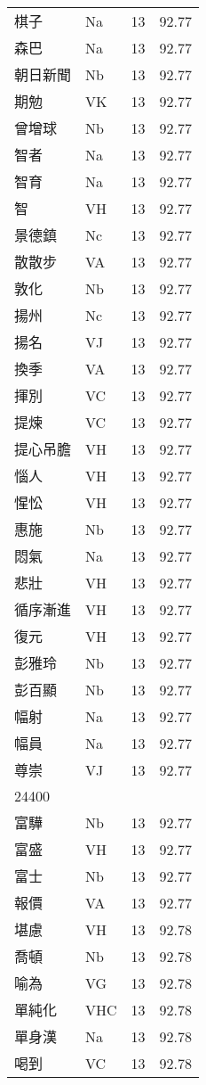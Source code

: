 \documentclass[twocolumn]{book}
\begin{document}
\begin{supertabular}{llrr}
棋子 & Na & 13 &  92.77\\
森巴 & Na & 13 &  92.77\\
朝日新聞 & Nb & 13 &  92.77\\
期勉 & VK & 13 &  92.77\\
曾增球 & Nb & 13 &  92.77\\
智者 & Na & 13 &  92.77\\
智育 & Na & 13 &  92.77\\
智 & VH & 13 &  92.77\\
景德鎮 & Nc & 13 &  92.77\\
散散步 & VA & 13 &  92.77\\
敦化 & Nb & 13 &  92.77\\
揚州 & Nc & 13 &  92.77\\
揚名 & VJ & 13 &  92.77\\
換季 & VA & 13 &  92.77\\
揮別 & VC & 13 &  92.77\\
提煉 & VC & 13 &  92.77\\
提心吊膽 & VH & 13 &  92.77\\
惱人 & VH & 13 &  92.77\\
惺忪 & VH & 13 &  92.77\\
惠施 & Nb & 13 &  92.77\\
悶氣 & Na & 13 &  92.77\\
悲壯 & VH & 13 &  92.77\\
循序漸進 & VH & 13 &  92.77\\
復元 & VH & 13 &  92.77\\
彭雅玲 & Nb & 13 &  92.77\\
彭百顯 & Nb & 13 &  92.77\\
幅射 & Na & 13 &  92.77\\
幅員 & Na & 13 &  92.77\\
尊崇 & VJ & 13 &  92.77\\
24400\\
富驊 & Nb & 13 &  92.77\\
富盛 & VH & 13 &  92.77\\
富士 & Nb & 13 &  92.77\\
報價 & VA & 13 &  92.77\\
堪慮 & VH & 13 &  92.78\\
喬頓 & Nb & 13 &  92.78\\
喻為 & VG & 13 &  92.78\\
單純化 & VHC & 13 &  92.78\\
單身漢 & Na & 13 &  92.78\\
喝到 & VC & 13 &  92.78\\

\end{supertabular}
\end{document}
